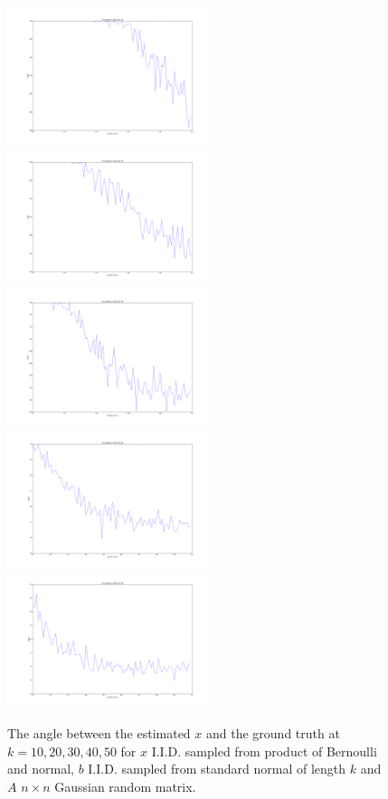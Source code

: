 \documentclass[letter, 10pt]{article}
\numberwithin{equation}{section}
\begin{document}
\begin{figure}
\includegraphics[width=6cm,keepaspectratio]{fig2/w_Norm_x_BerNorm_A_none_n100_k10_p__sigma0_00.png}
 \includegraphics[width=6cm,keepaspectratio]{fig2/w_Norm_x_BerNorm_A_none_n100_k20_p__sigma0_00.png}
\includegraphics[width=6cm,keepaspectratio]{fig2/w_Norm_x_BerNorm_A_none_n100_k30_p__sigma0_00.png}
\includegraphics[width=6cm,keepaspectratio]{fig2/w_Norm_x_BerNorm_A_none_n100_k40_p__sigma0_00.png}
\includegraphics[width=6cm,keepaspectratio]{fig2/w_Norm_x_BerNorm_A_none_n100_k50_p__sigma0_00.png}
\caption{The angle between the estimated $x$ and the ground truth at $k=10, 20, 30, 40, 50$ for $x$ I.I.D. sampled from product of Bernoulli and normal, $b$ I.I.D. sampled from standard normal of length $k$ and $A$ $n\times n$ Gaussian random matrix.   }
\end{figure}
\end{document}
